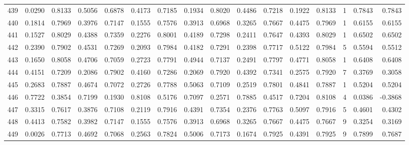 \begin{tabular}{lrrrrrrrrrrrrrrr}
439 &      0.0290 &  0.8133 &  0.5056 &  0.6878 &  0.4173 &  0.7185 &  0.1934 &  0.8020 &  0.4486 &  0.7218 &   0.1922 &     0.8133 &      1 &                    0.7843 &                     0.7843 \\
440 &      0.1814 &  0.7969 &  0.3976 &  0.7147 &  0.1555 &  0.7576 &  0.3913 &  0.6968 &  0.3265 &  0.7667 &   0.4475 &     0.7969 &      1 &                    0.6155 &                     0.6155 \\
441 &      0.1527 &  0.8029 &  0.4388 &  0.7359 &  0.2276 &  0.8001 &  0.4189 &  0.7298 &  0.2411 &  0.7647 &   0.4393 &     0.8029 &      1 &                    0.6502 &                     0.6502 \\
442 &      0.2390 &  0.7902 &  0.4531 &  0.7269 &  0.2093 &  0.7984 &  0.4182 &  0.7291 &  0.2398 &  0.7717 &   0.5122 &     0.7984 &      5 &                    0.5594 &                     0.5512 \\
443 &      0.1650 &  0.8058 &  0.4706 &  0.7059 &  0.2723 &  0.7791 &  0.4944 &  0.7137 &  0.2491 &  0.7797 &   0.4771 &     0.8058 &      1 &                    0.6408 &                     0.6408 \\
444 &      0.4151 &  0.7209 &  0.2086 &  0.7902 &  0.4160 &  0.7286 &  0.2069 &  0.7920 &  0.4392 &  0.7341 &   0.2575 &     0.7920 &      7 &                    0.3769 &                     0.3058 \\
445 &      0.2683 &  0.7887 &  0.4674 &  0.7072 &  0.2726 &  0.7788 &  0.5063 &  0.7109 &  0.2519 &  0.7801 &   0.4841 &     0.7887 &      1 &                    0.5204 &                     0.5204 \\
446 &      0.7722 &  0.3854 &  0.7199 &  0.1930 &  0.8108 &  0.5176 &  0.7097 &  0.2571 &  0.7885 &  0.4517 &   0.7204 &     0.8108 &      4 &                    0.0386 &                    -0.3868 \\
447 &      0.3315 &  0.7617 &  0.3876 &  0.7108 &  0.2119 &  0.7916 &  0.4391 &  0.7354 &  0.2376 &  0.7763 &   0.5097 &     0.7916 &      5 &                    0.4601 &                     0.4302 \\
448 &      0.4413 &  0.7582 &  0.3982 &  0.7147 &  0.1555 &  0.7576 &  0.3913 &  0.6968 &  0.3265 &  0.7667 &   0.4475 &     0.7667 &      9 &                    0.3254 &                     0.3169 \\
449 &      0.0026 &  0.7713 &  0.4692 &  0.7068 &  0.2563 &  0.7824 &  0.5006 &  0.7173 &  0.1674 &  0.7925 &   0.4391 &     0.7925 &      9 &                    0.7899 &                     0.7687 \\

\end{tabular}
